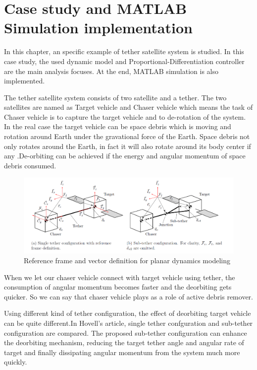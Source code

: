 \chapter{Case study and MATLAB Simulation implementation}\label{section-case}
In this chapter, an specific example\cite{hovell2017experimental} of tether satellite system is studied. In this case study, the used dynamic model and Proportional-Differentiation controller are the main analysis focuses. At the end, MATLAB simulation is also implemented.

The tether satellite system consists of two satellite and a tether. The two satellites are named as Target vehicle and Chaser vehicle which means the task of Chaser vehicle is to capture the target vehicle and to de-rotation of the system. In the real case the target vehicle can be space debris which is moving and rotation around Earth under the gravational force of the Earth. Space debris not only rotates around the Earth, in fact it will also rotate around its body center if any .De-orbiting can be achieved if the energy and angular momentum of space debris consumed.
\begin{figure}[ht]

\includegraphics[width=\textwidth]{fig/simulation/ReferenceFrame}
\caption{Reference frame and vector definition for planar dynamics modeling}

\end{figure}
When we let our chaser vehicle connect with target vehicle using tether, the consumption of angular momentum becomes faster and the deorbiting gets quicker.  
So we can say that chaser vehicle plays as a role of active debris remover.

Using different kind of tether configuration, the effect of deorbiting target vehicle can be quite different.In Hovell's article, single tether confguration and sub-tether configuration are compared. The proposed sub-tether configuration can enhance the deorbiting mechanism, reducing the target tether angle and angular rate of target and finally dissipating angular momentum from the system much more quickly.  
